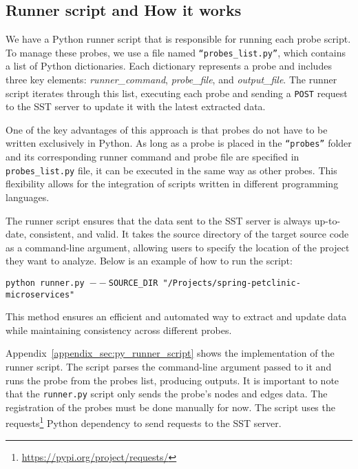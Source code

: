 \subsection{Runner script and How it works}

We have a Python runner script that is responsible for running each probe script. To manage these probes, we use a file named \texttt{``probes\_list.py''}, which contains a list of Python dictionaries. Each dictionary represents a probe and includes three key elements: \textit{runner\_command}, \textit{probe\_file}, and \textit{output\_file}. The runner script iterates through this list, executing each probe and sending a \texttt{POST} request to the SST server to update it with the latest extracted data.  

One of the key advantages of this approach is that probes do not have to be written exclusively in Python. As long as a probe is placed in the \texttt{``probes''} folder and its corresponding runner command and probe file are specified in \texttt{probes\_list.py} file, it can be executed in the same way as other probes. This flexibility allows for the integration of scripts written in different programming languages.  

The runner script ensures that the data sent to the SST server is always up-to-date, consistent, and valid. It takes the source directory of the target source code as a command-line argument, allowing users to specify the location of the project they want to analyze. Below is an example of how to run the script:

\begin{tcolorbox}[colback=gray!10, colframe=gray!20]
    \texttt{python runner.py \newline ${--}$SOURCE\_DIR "/Projects/spring-petclinic-microservices"}
\end{tcolorbox}

This method ensures an efficient and automated way to extract and update data while maintaining consistency across different probes.

Appendix~\ref{appendix_sec:py_runner_script} shows the implementation of the runner script. The script parses the command-line argument passed to it and runs the probe from the probes list, producing outputs. It is important to note that the \texttt{runner.py} script only sends the probe's nodes and edges data. The registration of the probes must be done manually for now. The script uses the requests\footnote{\url{https://pypi.org/project/requests/}} Python dependency to send requests to the SST server.